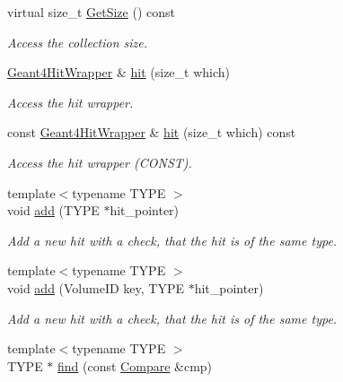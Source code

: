 \begin{DoxyCompactItemize}
virtual size\_\-t \hyperlink{class_d_d4hep_1_1_simulation_1_1_geant4_hit_collection_a0d6716e5834a70694d942deb0a412c2d}{GetSize} () const 
\begin{DoxyCompactList}\small\item\em Access the collection size. \item\end{DoxyCompactList}\item 
\hyperlink{class_d_d4hep_1_1_simulation_1_1_geant4_hit_wrapper}{Geant4HitWrapper} \& \hyperlink{class_d_d4hep_1_1_simulation_1_1_geant4_hit_collection_a6d42d1abdf6f052cc6606f0c55d55388}{hit} (size\_\-t which)
\begin{DoxyCompactList}\small\item\em Access the hit wrapper. \item\end{DoxyCompactList}\item 
const \hyperlink{class_d_d4hep_1_1_simulation_1_1_geant4_hit_wrapper}{Geant4HitWrapper} \& \hyperlink{class_d_d4hep_1_1_simulation_1_1_geant4_hit_collection_a50270ebfe8e744e54db874ec5d8ab075}{hit} (size\_\-t which) const 
\begin{DoxyCompactList}\small\item\em Access the hit wrapper (CONST). \item\end{DoxyCompactList}\item 
{\footnotesize template$<$typename TYPE $>$ }\\void \hyperlink{class_d_d4hep_1_1_simulation_1_1_geant4_hit_collection_ac9eec55500c5cc2af9cd0892c8956b76}{add} (TYPE $\ast$hit\_\-pointer)
\begin{DoxyCompactList}\small\item\em Add a new hit with a check, that the hit is of the same type. \item\end{DoxyCompactList}\item 
{\footnotesize template$<$typename TYPE $>$ }\\void \hyperlink{class_d_d4hep_1_1_simulation_1_1_geant4_hit_collection_a881aca58ab7a524451faf1ae4159dfe4}{add} (VolumeID key, TYPE $\ast$hit\_\-pointer)
\begin{DoxyCompactList}\small\item\em Add a new hit with a check, that the hit is of the same type. \item\end{DoxyCompactList}\item 
{\footnotesize template$<$typename TYPE $>$ }\\TYPE $\ast$ \hyperlink{class_d_d4hep_1_1_simulation_1_1_geant4_hit_collection_a7dfff7bafded0c36cfe093d477b1e518}{find} (const \hyperlink{class_d_d4hep_1_1_simulation_1_1_geant4_hit_collection_1_1_compare}{Compare} \&cmp)

\end{DoxyCompactItemize}

